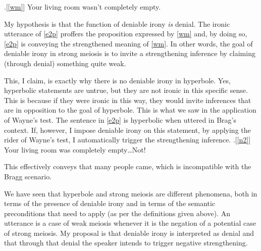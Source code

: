 \documentclass[a4paper,12pt,twoside]{article}
\begin{document}
\ex.[\ref{wm}] Your living room wasn't completely empty.

My hypothesis is that the function of deniable irony \emph{is} denial. The ironic utterance of \ref{e2p} proffers the proposition expressed by \ref{wm} and, by doing so, \ref{e2p} is conveying the strengthened meaning of \ref{wm}. In other words, the goal of deniable irony in strong meiosis is to invite a strengthening inference by claiming (through denial) something quite weak.

This, I claim, is exactly why there is no deniable irony in hyperbole. Yes, hyperbolic statements are untrue, but they are not ironic in this specific sense. This is because if they were ironic in this way, they would invite inferences that are in opposition to the goal of hyperbole. This is what we saw in the application of Wayne's test. The sentence in \ref{e2p} is hyperbolic when uttered in Brag's context. If, however, I impose deniable irony on this statement, by applying the rider of Wayne's test, I automatically trigger the strengthening inference.
\ex.[\ref{n2}] Your living room was completely empty\ldots{}Not!

This effectively conveys that many people came, which is incompatible with the Bragg scenario.


We have seen that hyperbole and strong meiosis are different phenomena, both in terms of the presence of deniable irony and in terms of the semantic preconditions that need to apply (as per the definitions given above). An utterance is a case of weak meiosis whenever it is the negation of a potential case of strong meiosis. My proposal is that deniable irony is interpreted as denial and that through that denial the speaker intends to trigger negative strengthening.
\end{document}
